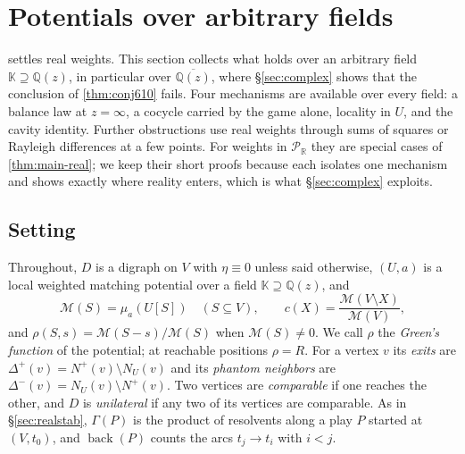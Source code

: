 \documentclass[11pt]{amsart}
\theoremstyle{plain}
\theoremstyle{definition}
\theoremstyle{remark}
\numberwithin{equation}{section}
\newcommand{\QQ}{\mathbb{Q}}
\newcommand{\RR}{\mathbb{R}}
\newcommand{\Qz}{\QQ(z)}
\newcommand{\Qzbar}{\overline{\QQ(z)}}
\newcommand{\Puis}{\mathcal{P}_{\RR}}
\newcommand{\Mpot}{\mathcal{M}}           %
\newcommand{\back}{\operatorname{back}}
\newcommand{\nplus}{N^{+}}
\begin{document}
\section{Potentials over arbitrary fields}\label{sec:fields}

 settles real weights. This section collects what holds over an arbitrary field $\mathbb K\supseteq\Qz$, in particular over $\Qzbar$, where \S\ref{sec:complex} shows that the conclusion of \cref{thm:conj610} fails. Four mechanisms are available over every field: a balance law at $z=\infty$, a cocycle carried by the game alone, locality in $U$, and the cavity identity. Further obstructions use real weights through sums of squares or Rayleigh differences at a few points. For weights in $\Puis$ they are special cases of \cref{thm:main-real}; we keep their short proofs because each isolates one mechanism and shows exactly where reality enters, which is what \S\ref{sec:complex} exploits.

\subsection{Setting}\label{ssec:fields-setting}
Throughout, $D$ is a digraph on $V$ with $\eta\equiv0$ unless said otherwise, $(U,a)$ is a local weighted matching potential over a field $\mathbb K\supseteq\Qz$, and
\[
\Mpot(S)=\mu_a(U[S])\quad(S\subseteq V),\qquad c(X)=\frac{\Mpot(V\setminus X)}{\Mpot(V)},
\]
and $\rho(S,s)=\Mpot(S-s)/\Mpot(S)$ when $\Mpot(S)\neq0$.
We call $\rho$ the \emph{Green's function} of the potential; at reachable positions $\rho=R$. For a vertex $v$ its \emph{exits} are $\Delta^{+}(v)=\nplus(v)\setminus N_U(v)$ and its \emph{phantom neighbors} are $\Delta^{-}(v)=N_U(v)\setminus\nplus(v)$. Two vertices are \emph{comparable} if one reaches the other, and $D$ is \emph{unilateral} if any two of its vertices are comparable. As in \S\ref{sec:realstab}, $\Gamma(P)$ is the product of resolvents along a play $P$ started at $(V,t_0)$, and $\back(P)$ counts the arcs $t_j\to t_i$ with $i<j$.
\end{document}
